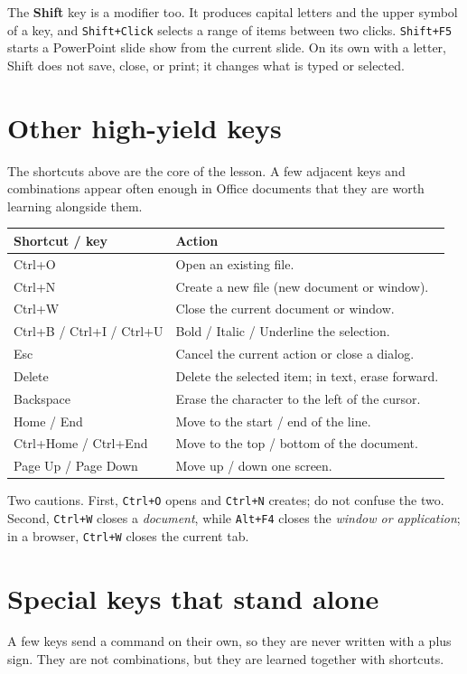 The \textbf{Shift} key is a modifier too. It produces capital letters and the
upper symbol of a key, and \texttt{Shift+Click} selects a range of items
between two clicks. \texttt{Shift+F5} starts a PowerPoint slide show from the
current slide. On its own with a letter, Shift does not save, close, or print;
it changes what is typed or selected.

\section{Other high-yield keys}
The shortcuts above are the core of the lesson. A few adjacent keys and
combinations appear often enough in Office documents that they are worth
learning alongside them.

\begin{center}
\begin{tabular}{p{}p{}}
\toprule
\textbf{Shortcut / key} & \textbf{Action} \\
\midrule
Ctrl+O & Open an existing file. \\
Ctrl+N & Create a new file (new document or window). \\
Ctrl+W & Close the current document or window. \\
Ctrl+B / Ctrl+I / Ctrl+U & Bold / Italic / Underline the selection. \\
Esc & Cancel the current action or close a dialog. \\
Delete & Delete the selected item; in text, erase forward. \\
Backspace & Erase the character to the left of the cursor. \\
Home / End & Move to the start / end of the line. \\
Ctrl+Home / Ctrl+End & Move to the top / bottom of the document. \\
Page Up / Page Down & Move up / down one screen. \\
\bottomrule
\end{tabular}
\end{center}

Two cautions. First, \texttt{Ctrl+O} opens and \texttt{Ctrl+N} creates; do not
confuse the two. Second, \texttt{Ctrl+W} closes a \emph{document}, while
\texttt{Alt+F4} closes the \emph{window or application}; in a browser,
\texttt{Ctrl+W} closes the current tab.

\section{Special keys that stand alone}
A few keys send a command on their own, so they are never written with a plus
sign. They are not combinations, but they are learned together with shortcuts.

